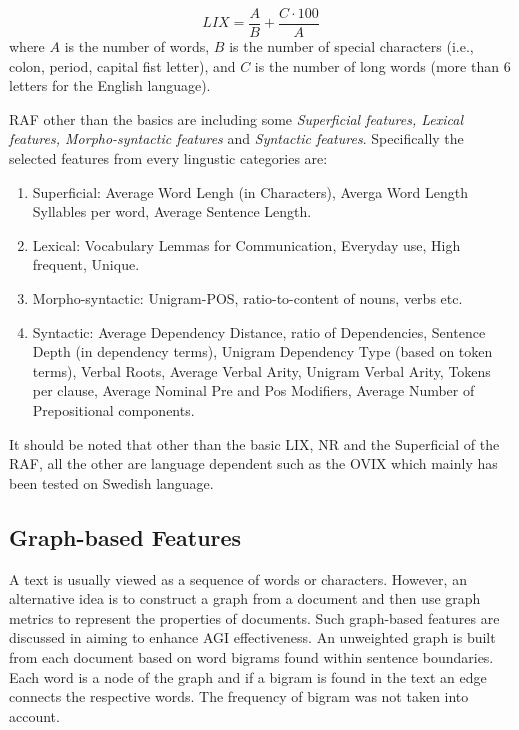 \begin{equation} \label{chap:relevant_work:eq:LIX}
	LIX = \frac{A}{B} + \frac{C \cdot 100}{A}
\end{equation}
\nointend where $A$ is the number of words, $B$ is the number of special characters (i.e., colon, period, capital fist letter), and $C$ is the number of long words (more than 6 letters for the English language). 

RAF other than the basics are including some \textit{Superficial features, Lexical features, Morpho-syntactic features} and \textit{Syntactic features}. Specifically the selected features from every lingustic categories are:

\begin{enumerate}
\item Superficial: Average Word Lengh (in Characters), Averga Word Length Syllables per word, Average Sentence Length.
\item Lexical: Vocabulary Lemmas for Communication, Everyday use, High frequent, Unique.
\item Morpho-syntactic: Unigram-POS, ratio-to-content of nouns, verbs etc.
\item Syntactic: Average Dependency Distance, ratio of Dependencies, Sentence Depth (in dependency terms), Unigram Dependency Type (based on token terms), Verbal Roots, Average Verbal Arity, Unigram Verbal Arity, Tokens per clause, Average Nominal Pre and Pos Modifiers, Average Number of Prepositional components.
\end{enumerate}

It should be noted that other than the basic LIX, NR and the Superficial of the RAF, all the other are language dependent such as the OVIX which mainly has been tested on Swedish language.

\subsection{Graph-based Features} 

A text is usually viewed as a sequence of words or characters. However, an alternative idea is to construct a graph from a document and then use graph metrics to represent the properties of documents. Such graph-based features are discussed in \parencite{nabhan2016graph} aiming to enhance AGI effectiveness. An unweighted graph is built from each document based on word bigrams found within sentence boundaries. Each word is a node of the graph and if a bigram is found in the text an edge connects the respective words. The frequency of bigram was not taken into account. 

